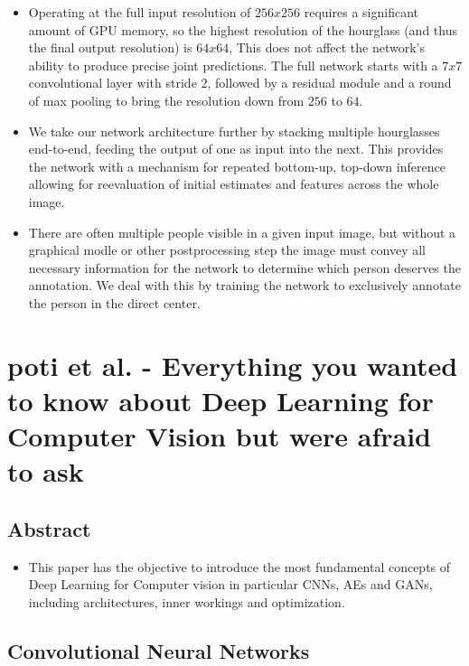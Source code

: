 \documentclass{report}
\begin{document}
\begin{itemize}
    \item Operating at the full input resolution of $256x256$ requires a significant amount of GPU memory, so the highest resolution of the hourglass (and thus the final output resolution) is $64x64$, This does not affect the network's ability to produce precise joint predictions. The full network starts with a $7x7$ convolutional layer with stride 2, followed by a residual module and a round of max pooling to bring the resolution down from $256$ to $64$. 
    \item We take our network architecture further by stacking multiple hourglasses end-to-end, feeding the output of one as input into the next. This provides the network with a mechanism for repeated bottom-up, top-down inference allowing for reevaluation of initial estimates and features across the whole image.
    \item There are often multiple people visible in a given input image, but without a graphical modle or other postprocessing step the image must convey all necessary information for the network to determine which person deserves the annotation. We deal with this by training the network to exclusively annotate the person in the direct center.
\end{itemize}

\section*{poti et al. - Everything you wanted to know about Deep Learning for Computer Vision but were afraid to ask}
\subsection*{Abstract}
\begin{itemize}
    \item This paper has the objective to introduce the most fundamental concepts of Deep Learning for Computer vision in particular CNNs, AEs and GANs, including architectures, inner workings and optimization.
\end{itemize}
\subsection*{Convolutional Neural Networks}
\end{document}
